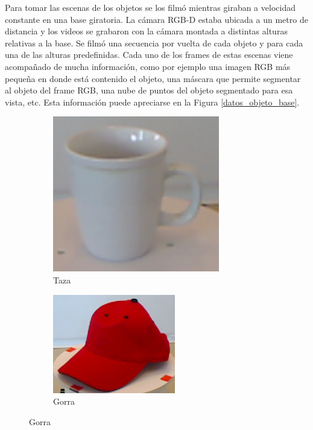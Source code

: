 Para tomar las escenas de los objetos se los filmó mientras giraban a velocidad constante en una base giratoria. La cámara RGB-D estaba ubicada a un metro de distancia y los videos se grabaron con la cámara montada a distintas alturas relativas a la base. Se filmó una secuencia por vuelta de cada objeto y para cada una de las alturas predefinidas. Cada uno de los frames de estas escenas viene acompañado de mucha información, como por ejemplo una imagen RGB más pequeña en donde está contenido el objeto, una máscara que permite segmentar al objeto del frame RGB, una nube de puntos del objeto segmentado para esa vista, etc. Esta información puede apreciarse en la Figura \ref{datos_objeto_base}.

\begin{figure}[t]
    \centering
    \begin{subfigure}[b]{0.4\textwidth}
		\centering
        \includegraphics[width=0.8\textwidth]{img/base_rgbd/crop.png}
        \caption{Taza}
		\label{fig:taza}
    \end{subfigure}
    \quad
    \begin{subfigure}[b]{0.4\textwidth}
		\centering
        \includegraphics[width=\textwidth]{img/base_rgbd/gorra.png}
        \caption{Gorra}
		\label{fig:gorra}
    \end{subfigure}


\end{figure}
